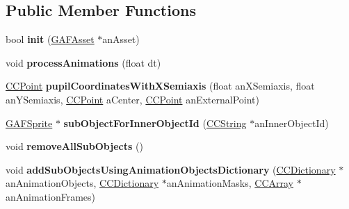 \subsection*{Public Member Functions}
\begin{DoxyCompactItemize}
\item 
\hypertarget{class_g_a_f_1_1_g_a_f_animated_object_a2d342145d85106586658123c42115f2d}{bool {\bfseries init} (\hyperlink{class_g_a_f_1_1_g_a_f_asset}{G\-A\-F\-Asset} $\ast$an\-Asset)}\label{class_g_a_f_1_1_g_a_f_animated_object_a2d342145d85106586658123c42115f2d}

\item 
\hypertarget{class_g_a_f_1_1_g_a_f_animated_object_abd1cb9fad4a76692f4ffb1a8dd699e31}{void {\bfseries process\-Animations} (float dt)}\label{class_g_a_f_1_1_g_a_f_animated_object_abd1cb9fad4a76692f4ffb1a8dd699e31}

\item 
\hypertarget{class_g_a_f_1_1_g_a_f_animated_object_afdc2654345e2e0bfed3297c709669bec}{\hyperlink{class_g_a_f_1_1_c_c_point}{C\-C\-Point} {\bfseries pupil\-Coordinates\-With\-X\-Semiaxis} (float an\-X\-Semiaxis, float an\-Y\-Semiaxis, \hyperlink{class_g_a_f_1_1_c_c_point}{C\-C\-Point} a\-Center, \hyperlink{class_g_a_f_1_1_c_c_point}{C\-C\-Point} an\-External\-Point)}\label{class_g_a_f_1_1_g_a_f_animated_object_afdc2654345e2e0bfed3297c709669bec}

\item 
\hypertarget{class_g_a_f_1_1_g_a_f_animated_object_aa1e91c2812fcb205a8caddcdcd9bf590}{\hyperlink{class_g_a_f_1_1_g_a_f_sprite}{G\-A\-F\-Sprite} $\ast$ {\bfseries sub\-Object\-For\-Inner\-Object\-Id} (\hyperlink{class_g_a_f_1_1_c_c_string}{C\-C\-String} $\ast$an\-Inner\-Object\-Id)}\label{class_g_a_f_1_1_g_a_f_animated_object_aa1e91c2812fcb205a8caddcdcd9bf590}

\item 
\hypertarget{class_g_a_f_1_1_g_a_f_animated_object_acfde8eb5779c5ae90d17009896520eff}{void {\bfseries remove\-All\-Sub\-Objects} ()}\label{class_g_a_f_1_1_g_a_f_animated_object_acfde8eb5779c5ae90d17009896520eff}

\item 
\hypertarget{class_g_a_f_1_1_g_a_f_animated_object_aa6044e9c297b3c652f7edad18d909a2f}{void {\bfseries add\-Sub\-Objects\-Using\-Animation\-Objects\-Dictionary} (\hyperlink{class_g_a_f_1_1_c_c_dictionary}{C\-C\-Dictionary} $\ast$an\-Animation\-Objects, \hyperlink{class_g_a_f_1_1_c_c_dictionary}{C\-C\-Dictionary} $\ast$an\-Animation\-Masks, \hyperlink{class_g_a_f_1_1_c_c_array}{C\-C\-Array} $\ast$an\-Animation\-Frames)}\label{class_g_a_f_1_1_g_a_f_animated_object_aa6044e9c297b3c652f7edad18d909a2f}


\end{DoxyCompactItemize}
